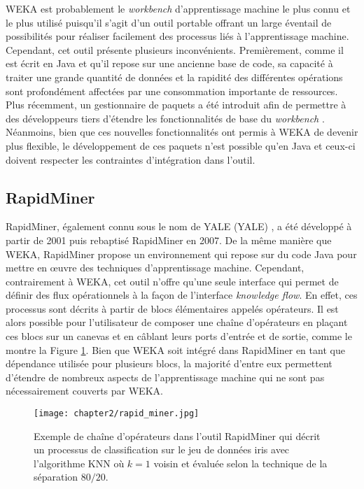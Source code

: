 \acs{WEKA} est probablement le \textit{workbench} d'apprentissage machine le plus connu et le plus utilisé puisqu'il s'agit d'un outil portable \citep{Bouckaert2010} offrant un large éventail de possibilités pour réaliser facilement des processus liés à l'apprentissage machine. Cependant, cet outil présente plusieurs inconvénients. Premièrement, comme il est écrit en Java et qu'il repose sur une ancienne base de code, sa capacité à traiter une grande quantité de données et la rapidité des différentes opérations sont profondément affectées par une consommation importante de ressources. Plus récemment, un gestionnaire de paquets a été introduit afin de permettre à des développeurs tiers d'étendre les fonctionnalités de base du \textit{workbench} \citep{Hall2009}. Néanmoins, bien que ces nouvelles fonctionnalités ont permis à \acs{WEKA} de devenir plus flexible, le développement de ces paquets n'est possible qu'en Java et ceux-ci doivent respecter les contraintes d'intégration dans l'outil.

\subsection{RapidMiner}

RapidMiner, également connu sous le nom de \acs{YALE} (\acl{YALE}) \citep{Ritthoo2003,Hofmann2014}, a été développé à partir de 2001 puis rebaptisé RapidMiner en 2007. De la même manière que \acs{WEKA}, RapidMiner propose un environnement qui repose sur du code Java pour mettre en \oe{}uvre des techniques d'apprentissage machine. Cependant, contrairement à \acs{WEKA}, cet outil n'offre qu'une seule interface qui permet de définir des flux opérationnels à la façon de l'interface \textit{knowledge flow}. En effet, ces processus sont décrits à partir de blocs élémentaires appelés opérateurs. Il est alors possible pour l'utilisateur de composer une chaîne d'opérateurs en plaçant ces blocs sur un canevas et en câblant leurs ports d'entrée et de sortie, comme le montre la Figure \ref{fig:rapid_miner}. Bien que \acs{WEKA} soit intégré dans RapidMiner en tant que dépendance utilisée pour plusieurs blocs, la majorité d'entre eux permettent d'étendre de nombreux aspects de l'apprentissage machine qui ne sont pas nécessairement couverts par \acs{WEKA}.

\begin{figure}[H]
	\centering
	\texttt{[image: chapter2/rapid\_miner.jpg]}
        \caption{Exemple de chaîne d'opérateurs dans l'outil RapidMiner qui décrit un processus de classification sur le jeu de données iris avec l'algorithme \acs{KNN} où $k=1$ voisin et évaluée selon la technique de la séparation $80/20$.}
	\label{fig:rapid_miner}
\end{figure}

